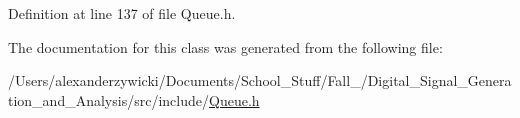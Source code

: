 Definition at line 137 of file Queue.\+h.



The documentation for this class was generated from the following file\+:\begin{DoxyCompactItemize}
\item 
/\+Users/alexanderzywicki/\+Documents/\+School\+\_\+\+Stuff/\+Fall\+\_/\+Digital\+\_\+\+Signal\+\_\+\+Generation\+\_\+and\+\_\+\+Analysis/src/include/\hyperlink{Queue_8h}{Queue.\+h}\end{DoxyCompactItemize}
